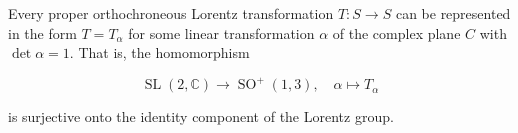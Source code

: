 Every proper orthochroneous Lorentz transformation $T: S \to S$ can be represented in the form $T = T_{\alpha}$ for some linear transformation $\alpha$ of the complex plane $C$ with $\det \alpha = 1$. That is, the homomorphism

$$\operatorname{SL}(2, \mathbb{C}) \to \operatorname{SO}^+(1, 3), \quad \alpha \mapsto T_{\alpha}$$

is surjective onto the identity component of the Lorentz group.
